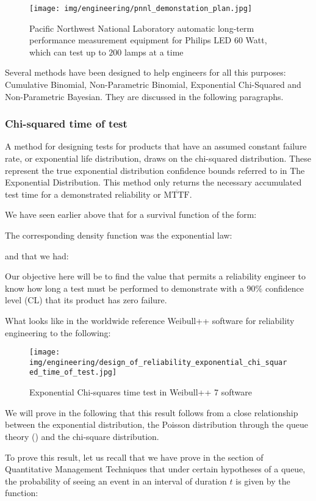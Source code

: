 	 \begin{figure}[H]
		\centering
		\texttt{[image: img/engineering/pnnl\_demonstation\_plan.jpg]}
		\caption{Pacific Northwest National Laboratory automatic long-term performance measurement equipment for  Philips LED 60 Watt, which can test up to $200$ lamps at a time}
	\end{figure}
	Several methods have been designed to help engineers for all this purposes: Cumulative Binomial, Non-Parametric Binomial, Exponential Chi-Squared and Non-Parametric Bayesian. They are discussed in the following paragraphs.
	
	\subsubsection{Chi-squared time of test}
	A method for designing tests for products that have an assumed constant failure rate, or exponential life distribution, draws on the chi-squared distribution. These represent the true exponential distribution confidence bounds referred to in The Exponential Distribution. This method only returns the necessary accumulated test time for a demonstrated reliability or $\overline{\text{MTTF}}$.
	
	We have seen earlier above that for a survival function of the form:
	
	The corresponding density function was the exponential law:
	
 	and that we had:
	
 	Our objective here will be to find the value that permits a reliability engineer to know how long a test must be performed to demonstrate with a $90\%$ confidence level (CL) that its product has zero failure.

	What looks like in the worldwide reference Weibull++ software for reliability engineering to the following:
	\begin{figure}[H]
		\centering
		\texttt{[image: img/engineering/design\_of\_reliability\_exponential\_chi\_squared\_time\_of\_test.jpg]}
		\caption{Exponential Chi-squares time test in Weibull++ 7 software}
	\end{figure}
	We will prove in the following that this result follows from a close relationship between the exponential distribution, the Poisson distribution through the queue theory () and the chi-square distribution.

	To prove this result, let us recall that we have prove in the section of Quantitative Management Techniques that under certain hypotheses of a queue, the probability of seeing an event in an interval of duration $t$ is given by the function:
	

